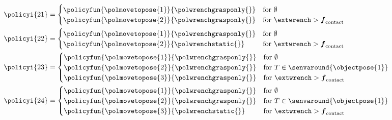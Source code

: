 \begin{align*}
&\policyi{21}=\begin{cases}
\policyfun{\polmovetopose{1}}{\polwrenchgrasponly{}} & \text{for } \emptyset \\
\policyfun{\polmovetopose{2}}{\polwrenchgrasponly{}} & \text{for } \extwrench > \boldsymbol{f}_\text{contact}
\end{cases}\\
&\policyi{22}=\begin{cases}
\policyfun{\polmovetopose{1}}{\polwrenchgrasponly{}} & \text{for } \emptyset \\
\policyfun{\polmovetopose{2}}{\polwrenchstatic{}} & \text{for } \extwrench > \boldsymbol{f}_\text{contact}
\end{cases}\\
&\policyi{23}=\begin{cases}
\policyfun{\polmovetopose{1}}{\polwrenchgrasponly{}} & \text{for } \emptyset \\
\policyfun{\polmovetopose{2}}{\polwrenchgrasponly{}} & \text{for } T \in \senvaround{\objectpose{1}} \\
\policyfun{\polmovetopose{3}}{\polwrenchgrasponly{}} & \text{for } \extwrench > \boldsymbol{f}_\text{contact}
\end{cases}\\
&\policyi{24}=\begin{cases}
\policyfun{\polmovetopose{1}}{\polwrenchgrasponly{}} & \text{for } \emptyset \\
\policyfun{\polmovetopose{2}}{\polwrenchgrasponly{}} & \text{for } T \in \senvaround{\objectpose{1}} \\
\policyfun{\polmovetopose{3}}{\polwrenchstatic{}} & \text{for } \extwrench > \boldsymbol{f}_\text{contact}
\end{cases}
\end{align*}

